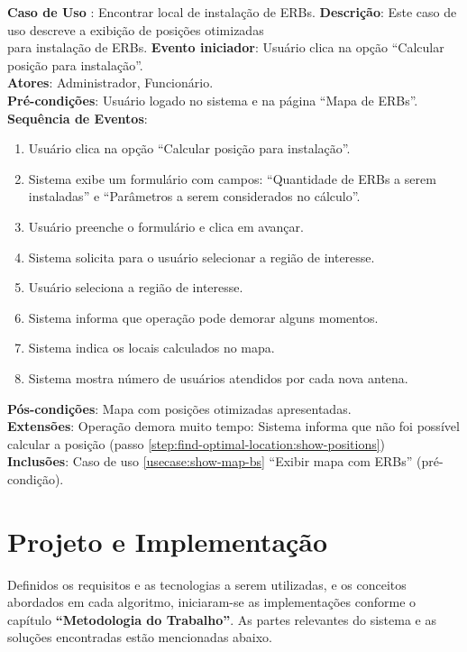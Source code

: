 \documentclass[]{politex}
\begin{document}
\noindent \textbf{Caso de Uso }: Encontrar local de instalação de ERBs.
\textbf{Descrição}: Este caso de uso descreve a exibição de posições otimizadas \\
para instalação de ERBs.
\textbf{Evento iniciador}: Usuário clica na opção ``Calcular posição para instalação''. \\
\textbf{Atores}: Administrador, Funcionário. \\
\textbf{Pré-condições}: Usuário logado no sistema e na página ``Mapa de ERBs''. \\
\textbf{Sequência de Eventos}:
\begin{enumerate}
\item Usuário clica na opção ``Calcular posição para instalação''.
\item Sistema exibe um formulário com campos: ``Quantidade de ERBs a serem
instaladas'' e ``Parâmetros a serem considerados no cálculo''.
\item Usuário preenche o formulário e clica em avançar.
\item Sistema solicita para o usuário selecionar a região de interesse.
\item Usuário seleciona a região de interesse.
\item Sistema informa que operação pode demorar alguns momentos.
\item\label{step:find-optimal-location:show-positions} Sistema indica os locais calculados no mapa.
\item Sistema mostra número de usuários atendidos por cada nova antena.
\end{enumerate}
\textbf{Pós-condições}: Mapa com posições otimizadas apresentadas. \\
\textbf{Extensões}: Operação demora muito tempo: Sistema informa que não foi
possível calcular a posição (passo \ref{step:find-optimal-location:show-positions}) \\
\textbf{Inclusões}: Caso de uso \ref{usecase:show-map-bs} ``Exibir mapa com ERBs'' (pré-condição). \\

\chapter{Projeto e Implementação}

Definidos os requisitos e as tecnologias a serem utilizadas, e os conceitos
abordados em cada algoritmo, iniciaram-se as implementações conforme o capítulo
\textbf{``Metodologia do Trabalho''}. As partes relevantes do sistema e as
soluções encontradas estão mencionadas abaixo.
\end{document}
